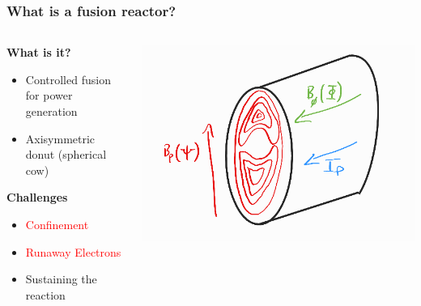 \documentclass{beamer}
\begin{document}
\begin{frame}
\begin{columns}[T]
\end{columns}

\end{frame}
















\begin{frame}
\frametitle{What is a fusion reactor?}

\begin{columns}[T]

    \begin{column}{.5\textwidth}
        \textbf{What is it?}
        \begin{itemize}
            \item Controlled fusion for power generation
            \item Axisymmetric donut (spherical cow)
        \end{itemize}

        \textbf{Challenges}
        \begin{itemize}
            \item \textcolor{red}{Confinement}
            \item \textcolor{red}{Runaway Electrons}
            \item Sustaining the reaction
        \end{itemize}\vspace{9em}
    \end{column}

    \begin{column}{.5\textwidth}
        \includegraphics[scale=1.2]{imgs/flux-functions.png}
    \end{column}

\end{columns}

\end{frame}
\end{document}
